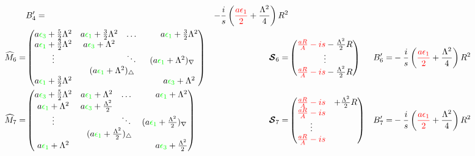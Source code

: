 \documentclass[aps,prd,onecolumn
,tightenlines,letterpaper,
notitlepage,11pt,linenumbers,
nofootinbib]{revtex4-1}
\begin{document}
\begin{align*}
&
B'_4=&-\frac{i}{s}\left(\red{\frac{a\epsilon_1}{2}}+\frac{\Lambda^2}{4}\right)R^2
\\
\cM_6 =&
\begin{pmatrix}
a\green{\epsilon_3}+\frac{5}{2}\Lambda^2 & a\green{\epsilon_1}+\frac{3}{2}\Lambda^2 & 
\multicolumn{2}{l}{\ldots} &a\green{\epsilon_1}+\frac{3}{2}\Lambda^2 \\ 
a\green{\epsilon_1}+\frac{3}{2}\Lambda^2 & a\green{\epsilon_3}+\Lambda^2 & & &\\
\vdots&& \ddots\;\;\; &\multicolumn{2}{c}{\!\!\!\!(a\green{\epsilon_1}+\Lambda^2)_\nabla}\\
 &\multicolumn{2}{c}{(a\green{\epsilon_1}+\Lambda^2)_\triangle} &  & \\
  a\green{\epsilon_1}+\frac{3}{2}\Lambda^2& & & & a\green{\epsilon_3}+\Lambda^2 \\
\end{pmatrix}
&
\ve{\cS}_6 =&\begin{pmatrix}\red{\frac{aR}{A}-is}-\frac{\Lambda^2}{2}R\\ \vdots\\
\red{\frac{aR}{A}-is}-\frac{\Lambda^2}{2}R\end{pmatrix}
&
B'_6=&-\frac{i}{s}\left(\red{\frac{a\epsilon_1}{2}}+\frac{\Lambda^2}{4}\right)R^2
\\
\cM_7 =&
\begin{pmatrix}
a\green{\epsilon_3}+\frac{5}{2}\Lambda^2 & a\green{\epsilon_1}+\Lambda^2 & 
\multicolumn{2}{l}{\ldots} &a\green{\epsilon_1}+\Lambda^2 \\ 
a\green{\epsilon_1}+\Lambda^2 & a\green{\epsilon_3}+\frac{\Lambda^2}{2} & & &\\
\vdots&& \ddots\;\;\; &\multicolumn{2}{c}{\!\!\!\!(a\green{\epsilon_1}+\frac{\Lambda^2}{2})_\nabla}\\
 &\multicolumn{2}{c}{(a\green{\epsilon_1}+\frac{\Lambda^2}{2})_\triangle} &  & \\
  a\green{\epsilon_1}+\Lambda^2& & & & a\green{\epsilon_3}+\frac{\Lambda^2}{2} \\
\end{pmatrix}
&
\ve{\cS}_7 =&\begin{pmatrix}\red{\frac{aR}{A}-is}&+\frac{\Lambda^2}{2}R\\\red{\frac{aR}{A}-is}&\\ \vdots&\\
\red{\frac{aR}{A}-is}&\end{pmatrix}
&
B'_7=&-\frac{i}{s}\left(\red{\frac{a\epsilon_1}{2}}+\frac{\Lambda^2}{4}\right)R^2
\\

\end{align*}
\end{document}

